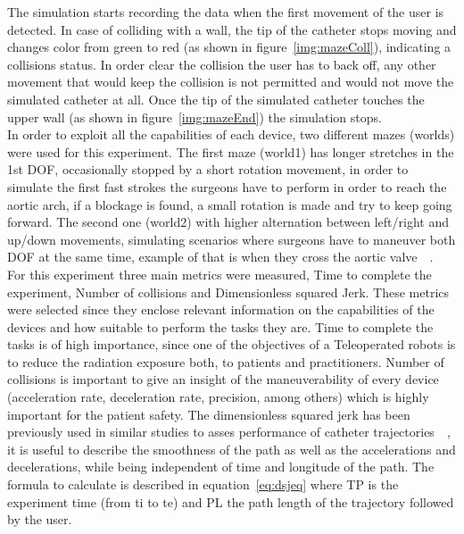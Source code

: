 The simulation starts recording the data when the first movement of the user is detected. In case of colliding with a wall, the tip of the catheter stops moving and changes color from green to red (as shown in figure~\ref{img:mazeColl}), indicating a collisions status. In order clear the collision the user has to back off, any other movement that would keep the collision is not permitted and would not move the simulated catheter at all. Once the tip of the simulated catheter touches the upper wall (as shown in figure~\ref{img:mazeEnd}) the simulation stops.\\

In order to exploit all the capabilities of each device, two different mazes (worlds) were used for this experiment. The first maze (world1) has longer stretches in the 1st DOF, occasionally stopped by a short rotation movement, in order to simulate the first fast strokes the surgeons have to perform in order to reach the aortic arch, if a blockage is found, a small rotation is made and try to keep going forward. The second one (world2) with higher alternation between left/right and up/down movements, simulating scenarios where surgeons have to maneuver both DOF at the same time, example of that is when they cross the aortic valve~\cite{raptech}~\cite{anatomic}.\\

For this experiment three main metrics were measured, Time to complete the experiment, Number of collisions and Dimensionless squared Jerk. These metrics were selected since they enclose relevant information on the capabilities of the devices and how suitable to perform the tasks they are. Time to complete the tasks is of high importance, since one of the objectives of a Teleoperated robots is to reduce the radiation exposure both, to patients and practitioners. Number of collisions is important to give an insight of the maneuverability of every device (acceleration rate, deceleration rate, precision, among others) which is highly important for the patient safety. The dimensionless squared jerk has been previously used in similar studies to asses performance of catheter trajectories~\cite{dsj}~\cite{dsj2}, it is useful to describe the smoothness of the path as well as the accelerations and decelerations, while being independent of time and longitude of the path. The formula to calculate is described in equation~\ref{eq:dsjeq} where TP is the experiment time (from ti to te) and PL the path length of the trajectory followed by the user.\\

